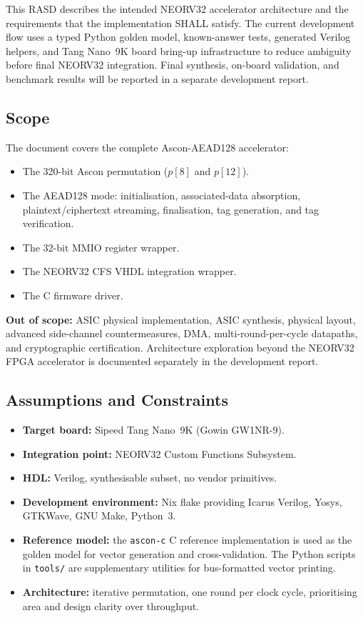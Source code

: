 \documentclass[11pt,a4paper]{article}
\begin{document}
This RASD describes the intended NEORV32 accelerator architecture and the
requirements that the implementation SHALL satisfy. The current development
flow uses a typed Python golden model, known-answer tests, generated Verilog
helpers, and Tang Nano~9K board bring-up infrastructure to reduce ambiguity
before final NEORV32 integration. Final synthesis, on-board validation, and
benchmark results will be reported in a separate development report.

\subsection{Scope}

The document covers the complete Ascon-AEAD128 accelerator:

\begin{itemize}
  \item The 320-bit Ascon permutation ($p[8]$ and $p[12]$).
  \item The AEAD128 mode: initialisation, associated-data absorption,
        plaintext/ciphertext streaming, finalisation, tag generation,
        and tag verification.
  \item The 32-bit MMIO register wrapper.
  \item The NEORV32 CFS VHDL integration wrapper.
  \item The C firmware driver.
\end{itemize}

\textbf{Out of scope:} ASIC physical implementation, ASIC synthesis, physical
layout, advanced side-channel countermeasures, DMA, multi-round-per-cycle
datapaths, and cryptographic certification. Architecture exploration beyond
the NEORV32 FPGA accelerator is documented separately in the development report.

\subsection{Assumptions and Constraints}

\begin{itemize}
  \item \textbf{Target board:} Sipeed Tang Nano~9K (Gowin GW1NR-9).
  \item \textbf{Integration point:} NEORV32 Custom Functions Subsystem.
  \item \textbf{HDL:} Verilog, synthesisable subset, no vendor primitives.
  \item \textbf{Development environment:} Nix flake providing Icarus Verilog,
        Yosys, GTKWave, GNU Make, Python~3.
  \item \textbf{Reference model:} the \texttt{ascon-c} C reference
        implementation is used as the golden model for vector generation
        and cross-validation. The Python scripts in \texttt{tools/} are
        supplementary utilities for bus-formatted vector printing.
  \item \textbf{Architecture:} iterative permutation, one round per clock
        cycle, prioritising area and design clarity over throughput.
\end{itemize}
\end{document}
